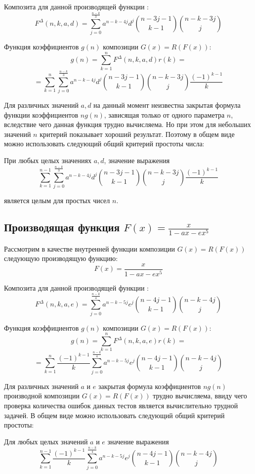 \documentclass[
russian,
cp1251,
14pt,
simple
]{eskdtext}
\theoremstyle{definition}
\begin{document}
Композита для данной производящей функции \cite{KruchininVV}:
$$
F^\Delta(n,k,a,d)=\sum_{j=0}^{\frac{n-k}{3}}{a^{n-k-4 j} d^{j} {n-3 j-1 \choose k-1} {n-k-3 j \choose j}}
$$

Функция коэффициентов $g(n)$ композиции $G(x)=R(F(x))$:
$$
g(n)=\sum_{k=1}^{n}{F^\Delta(n,k,a,d) r(k)}=
$$
$$
=\sum_{k=1}^{n}{\sum_{j=0}^{\frac{n-k}{3}}{a^{n-k-4 j} d^{j} {n-3 j-1 \choose k-1} {n-k-3 j \choose j} \frac{(-1)^{k-1}}{k}}}
$$

Для различных значений $a, d$ на данный момент неизвестна закрытая формула функции коэффициентов $ng(n)$, зависящая только от одного параметра $n$, вследствие чего данная функция трудно вычисляема. Но при этом для небольших значений $n$ критерий показывает хороший результат. Поэтому в общем виде можно использовать следующий общий критерий простоты числа:

При любых целых значениях $a, d$, значение выражения
$$
\sum_{k=1}^{n-1}{\sum_{j=0}^{\frac{n-k}{3}}{a^{n-k-4 j} d^{j} {n-3 j-1 \choose k-1} {n-k-3 j \choose j} \frac{(-1)^{k-1}}{k}}}
$$

является целым для простых чисел $n$.

\subsection{Производящая функция $F(x)=\frac{x}{1- a x - e x^5}$}
Рассмотрим в качестве внутренней функции композиции $G(x)=R(F(x))$ следующую производящую функцию:
$$
F(x)=\frac{x}{1 - ax - ex^5}
$$

Композита для данной производящей функции \cite{KruchininVV}:
$$
F^\Delta(n,k,a,e)=\sum\limits _{j=0}^{\frac{n - k}{4}} a^{n - k - 5j} e^j {n - 4j - 1 \choose k - 1} {n - k - 4j \choose j}
$$

Функция коэффициентов $g(n)$ композиции $G(x)=R(F(x))$:
$$
g(n)=\sum\limits _{k=1}^{n}{F^\Delta(n,k,a,e)r(k)}=
$$
$$
=\sum\limits _{k=1}^{n} \frac{(-1)^{k-1}}{k} \sum\limits _{j=0}^{\frac{n - k}{4}} {a^{n - k - 5j} e^j {n - 4j - 1 \choose k - 1} {n - k - 4j \choose j}}
$$

Для различных значений $a$ и $e$ закрытая формула коэффициентов $ng(n)$ производной композиции $G(x)=R(F(x))$ трудно вычисляема, ввиду чего проверка количества ошибок данных тестов является вычислительно трудной задачей. В общем виде можно использовать следующий общий критерий простоты:

Для любых целых значений $a$ и $e$ значение выражения
$$
\sum\limits _{k=1}^{n-1} \frac{(-1)^{k-1}}{k} \sum\limits _{j=0}^{\frac{n - k}{4}} {a^{n - k - 5j} e^j {n - 4j - 1 \choose k - 1} {n - k - 4j \choose j}}
$$
\end{document}
